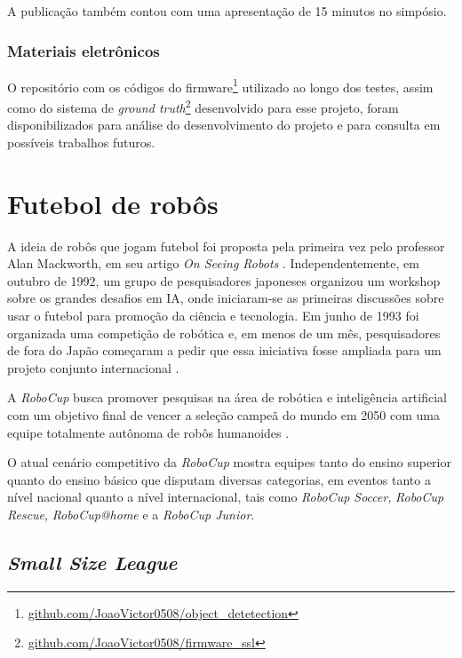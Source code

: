 \documentclass[acronym, symbols, table]{fei}
\begin{document}
			A publicação também contou com uma apresentação de 15 minutos no simpósio.
			
		\subsection{Materiais eletrônicos}
		
			O repositório com os códigos do firmware\footnote{\href{https://github.com/JoaoVictor0508/object_detetection/tree/main}{github.com/JoaoVictor0508/object\_detetection}} utilizado ao longo dos testes, assim como do sistema de \textit{ground truth}\footnote{\href{https://github.com/JoaoVictor0508/firmware_ssl}{github.com/JoaoVictor0508/firmware\_ssl}} desenvolvido para esse projeto, foram disponibilizados para análise do desenvolvimento do projeto e para consulta em possíveis trabalhos futuros.

	\chapter{Futebol de robôs}\label{sec:chapter_futebol_robos}
	
		A ideia de robôs que jogam futebol foi proposta pela primeira vez pelo professor Alan Mackworth, em seu artigo \textit{On Seeing Robots} \cite{OnSeeingRobots}. Independentemente, em outubro de 1992, um grupo de pesquisadores japoneses organizou um workshop sobre os grandes desafios em IA, onde iniciaram-se as primeiras discussões sobre usar o futebol para promoção da ciência e tecnologia. Em junho de 1993 foi organizada uma competição de robótica e, em menos de um mês, pesquisadores de fora do Japão começaram a pedir que essa iniciativa fosse ampliada para um projeto conjunto internacional \cite{RoboCup}.
		
		A \textit{RoboCup} busca promover pesquisas na área de robótica e inteligência artificial com um objetivo final de vencer a seleção campeã do mundo em 2050 com uma equipe totalmente autônoma de robôs humanoides \cite{RoboCup}.
		
		O atual cenário competitivo da \textit{RoboCup} mostra equipes tanto do ensino superior quanto do ensino básico que disputam diversas categorias, em eventos tanto a nível nacional quanto a nível internacional, tais como \textit{RoboCup Soccer}, \textit{RoboCup Rescue}, \textit{RoboCup@home} e a \textit{RoboCup Junior}.
	
	\section{\textit{Small Size League}} \label{sec:small_size_league}
	
\end{document}
